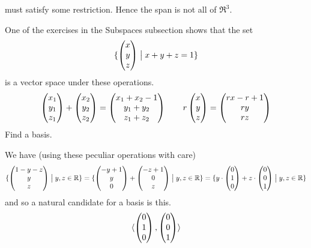 \begin{exercises}
\begin{answer}
\begin{exparts}
           must satisfy some restriction.
           Hence the span is not all of $\Re^3$.
       \end{exparts}  
    \end{answer}
  \item 
    One of the exercises in the Subspaces subsection shows that the set 
    \begin{equation*}
      \mbox{$\{\begin{pmatrix} x \\ y \\ z \end{pmatrix}\bigm| x+y+z=1\}$}
    \end{equation*}
    is a vector space under these operations.
    \begin{equation*}
      \begin{pmatrix} x_1 \\ y_1 \\ z_1 \end{pmatrix}+\begin{pmatrix} x_2 \\ y_2 \\ z_2 \end{pmatrix}
      =\begin{pmatrix} x_1+x_2-1 \\ y_1+y_2 \\ z_1+z_2 \end{pmatrix}
      \qquad
      r\begin{pmatrix} x \\ y \\ z \end{pmatrix}=\begin{pmatrix} rx-r+1 \\ ry \\ rz \end{pmatrix}
    \end{equation*}
    Find a basis.
    \begin{answer}
      We have (using these peculiar operations with care)
      \begin{equation*}
        \mbox{$\{\begin{pmatrix} 1-y-z \\ y \\ z \end{pmatrix}\bigm| y,z\in\mathbb{R}\}$}
         =\mbox{$\{\begin{pmatrix} -y+1 \\ y \\ 0 \end{pmatrix}
               +\begin{pmatrix} -z+1 \\ 0 \\ z \end{pmatrix}
              \bigm| y,z\in\mathbb{R}\}$}              
         =\mbox{$\{y\cdot\begin{pmatrix} 0 \\ 1 \\ 0 \end{pmatrix}
               +z\cdot\begin{pmatrix} 0 \\ 0 \\ 1 \end{pmatrix}
              \bigm| y,z\in\mathbb{R}\}$}
      \end{equation*}
      and so a natural candidate for a basis is this.
      \begin{equation*}
        \sequence{\colvec{0 \\ 1 \\ 0},\colvec{0 \\ 0 \\ 1}}

\end{equation*}
\end{answer}
\end{exercises}
